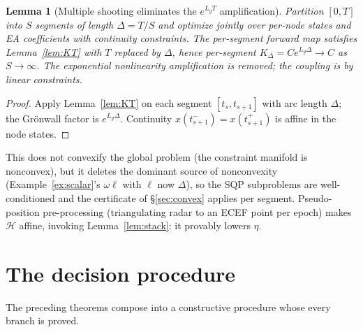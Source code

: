 \documentclass[11pt]{article}
\theoremstyle{plain}
\newtheorem{lemma}[theorem]{Lemma}
\theoremstyle{definition}
\theoremstyle{remark}
\begin{document}
\begin{lemma}[Multiple shooting eliminates the $e^{L_gT}$ amplification]
\label{lem:ms}
Partition $[0,T]$ into $S$ segments of length $\Delta=T/S$ and optimize
jointly over per-node states and EA coefficients with continuity
constraints. The per-segment forward map satisfies
Lemma~\ref{lem:KT} with $T$ replaced by $\Delta$, hence per-segment
$K_\Delta=Ce^{L_g\Delta}\to C$ as $S\to\infty$. The exponential
nonlinearity amplification is removed; the coupling is by \emph{linear}
constraints.
\end{lemma}
\begin{proof}
Apply Lemma~\ref{lem:KT} on each segment $[t_{s},t_{s+1}]$ with arc
length $\Delta$; the Gr\"onwall factor is $e^{L_g\Delta}$. Continuity
$x(t_{s+1}^-)=x(t_{s+1}^+)$ is affine in the node states.
\end{proof}

This does not convexify the global problem (the constraint manifold is
nonconvex), but it deletes the dominant source of nonconvexity
(Example~\ref{ex:scalar}'s $\omega\ell$ with $\ell$ now $\Delta$), so the
SQP subproblems are well-conditioned and the certificate of
\S\ref{sec:convex} applies per segment. Pseudo-position pre-processing
(triangulating radar to an ECEF point per epoch) makes $\mathcal H$
affine, invoking Lemma~\ref{lem:stack}: it provably lowers $\eta$.

\section{The decision procedure}\label{sec:proc}

The preceding theorems compose into a constructive procedure whose every
branch is proved.
\end{document}
